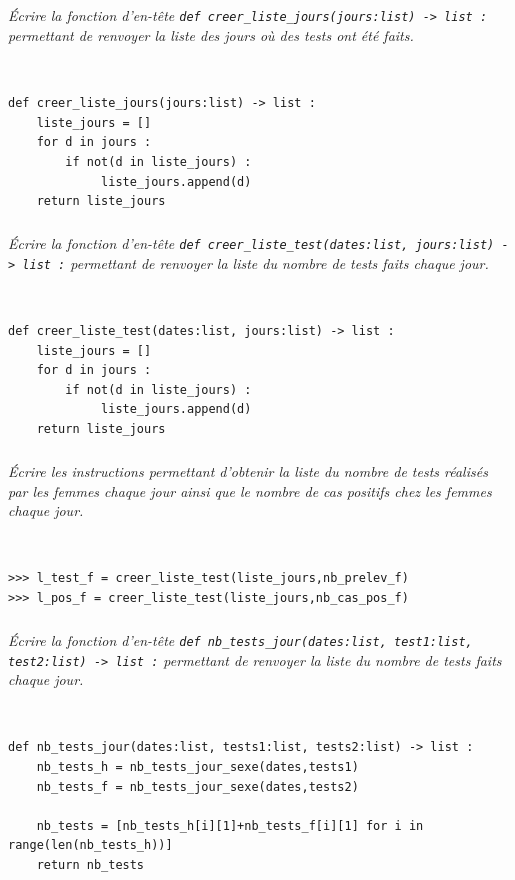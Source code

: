 \documentclass[10pt,fleqn]{article} %
\begin{document}
\subparagraph{}
\textit{Écrire la fonction d’en-tête \texttt{def creer\_liste\_jours(jours:list) -> list :} permettant de renvoyer la liste des jours où des tests ont été faits.}
\ifprof
\begin{corrige}~\\
\begin{lstlisting}
def creer_liste_jours(jours:list) -> list :
    liste_jours = []
    for d in jours :
        if not(d in liste_jours) :
             liste_jours.append(d)
    return liste_jours 
\end{lstlisting}
\end{corrige}
\else
\fi


\subparagraph{}
\textit{Écrire la fonction d’en-tête \texttt{def creer\_liste\_test(dates:list, jours:list) -> list :} permettant de renvoyer la liste du nombre de tests faits chaque jour.}
\ifprof
\begin{corrige}~\\
\begin{lstlisting}
def creer_liste_test(dates:list, jours:list) -> list :
    liste_jours = []
    for d in jours :
        if not(d in liste_jours) :
             liste_jours.append(d)
    return liste_jours 
\end{lstlisting}
\end{corrige}
\else
\fi


\subparagraph{}
\textit{Écrire les instructions permettant d'obtenir la liste du nombre de tests réalisés par les femmes chaque jour ainsi que le nombre de cas positifs chez les femmes chaque jour.}
\ifprof
\begin{corrige}~\\
\begin{lstlisting}
>>> l_test_f = creer_liste_test(liste_jours,nb_prelev_f)
>>> l_pos_f = creer_liste_test(liste_jours,nb_cas_pos_f)
\end{lstlisting}
\end{corrige}
\else
\fi



\subparagraph{}
\textit{Écrire la fonction d’en-tête \texttt{def nb\_tests\_jour(dates:list, test1:list, test2:list) -> list :} permettant de renvoyer la liste du nombre de tests faits chaque jour.}
\ifprof
\begin{corrige}~\\
\begin{lstlisting}
def nb_tests_jour(dates:list, tests1:list, tests2:list) -> list :
    nb_tests_h = nb_tests_jour_sexe(dates,tests1)
    nb_tests_f = nb_tests_jour_sexe(dates,tests2)
    
    nb_tests = [nb_tests_h[i][1]+nb_tests_f[i][1] for i in range(len(nb_tests_h))]
    return nb_tests
\end{lstlisting}
\end{corrige}
\else
\fi
\end{document}
